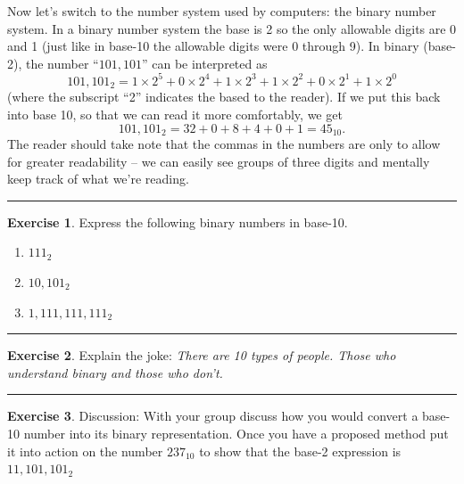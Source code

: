 \documentclass[
]{book}
\providecommand{\tightlist}{%
  \setlength{\itemsep}{0pt}\setlength{\parskip}{0pt}}
\theoremstyle{definition}
\theoremstyle{definition}
\theoremstyle{definition}
\newtheorem{exercise}{Exercise}[chapter]
\theoremstyle{remark}
\begin{document}
Now let's switch to the number system used by computers: the binary
number system. In a binary number system the base is 2 so the only
allowable digits are 0 and 1 (just like in base-10 the allowable digits
were 0 through 9). In binary (base-2), the number ``\(101,101\)'' can be
interpreted as
\[101,101_2 = 1 \times 2^5 + 0 \times 2^4 + 1 \times 2^3 + 1 \times 2^2 + 0 \times 2^1 + 1
\times 2^0\] (where the subscript ``2'' indicates the based to the
reader). If we put this back into base 10, so that we can read it more
comfortably, we get \[101,101_2 = 32 + 0 + 8 + 4 + 0 + 1 = 45_{10}.\]
The reader should take note that the commas in the numbers are only to
allow for greater readability -- we can easily see groups of three
digits and mentally keep track of what we're reading.

\begin{center}\rule{0.5\linewidth}{0.5pt}\end{center}

\begin{exercise}
\protect\hypertarget{exr:unnamed-chunk-8}{}{\label{exr:unnamed-chunk-8} }Express the following binary numbers in base-10.

\begin{enumerate}
\def\labelenumi{\arabic{enumi}.}
\tightlist
\item
  \(111_2\)
\item
  \(10,101_2\)
\item
  \(1,111,111,111_2\)
\end{enumerate}
\end{exercise}

\begin{center}\rule{0.5\linewidth}{0.5pt}\end{center}

\begin{exercise}
\protect\hypertarget{exr:unnamed-chunk-9}{}{\label{exr:unnamed-chunk-9} }Explain the joke: \emph{There are 10 types of people. Those who understand binary and those who
don't.}
\end{exercise}

\begin{center}\rule{0.5\linewidth}{0.5pt}\end{center}

\begin{exercise}
\protect\hypertarget{exr:unnamed-chunk-10}{}{\label{exr:unnamed-chunk-10} }Discussion: With your group discuss how you would convert a base-10
number into its binary representation. Once you have a proposed method
put it into action on the number \(237_{10}\) to show that the base-2 expression is
\(11,101,101_2\)
\end{exercise}
\end{document}
